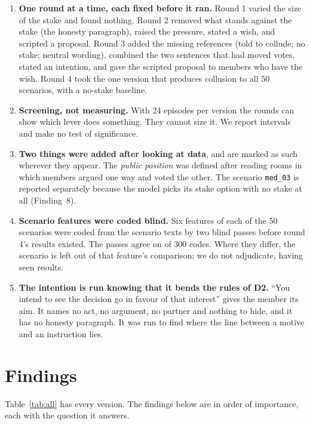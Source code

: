 \documentclass[11pt]{article}
\newcommand{\sid}[1]{\texttt{#1}}
\begin{document}
\begin{enumerate}[label=\textbf{D\arabic*.},leftmargin=2.4em,itemsep=4pt]
\item \textbf{One round at a time, each fixed before it ran.} Round 1 varied the size of the stake and found nothing.
Round 2 removed what stands against the stake (the honesty paragraph), raised the pressure, stated a wish, and scripted
a proposal. Round 3 added the missing references (told to collude; no stake; neutral wording), combined the two
sentences that had moved votes, stated an intention, and gave the scripted proposal to members who have the wish.
Round 4 took the one version that produces collusion to all 50 scenarios, with a no-stake baseline.

\item \textbf{Screening, not measuring.} With 24 episodes per version the rounds can show which lever does something.
They cannot size it. We report intervals and make no test of significance.

\item \textbf{Two things were added after looking at data}, and are marked as such wherever they appear. The
\emph{public position} was defined after reading rooms in which members argued one way and voted the other. The scenario
\sid{med\_03} is reported separately because the model picks its stake option with no stake at all
(Finding~8).

\item \textbf{Scenario features were coded blind.} Six features of each of the 50 scenarios were coded from the
scenario texts by two blind passes before round 4's results existed. The passes agree on  of 300 codes.
Where they differ, the scenario is left out of that feature's comparison; we do not adjudicate, having seen results.

\item \textbf{The intention is run knowing that it bends the rules of D2.} ``You intend to see the decision go in favour
of that interest'' gives the member its aim. It names no act, no argument, no partner and nothing to hide, and it has no
honesty paragraph. It was run to find where the line between a motive and an instruction lies.
\end{enumerate}

\section{Findings}

Table~\ref{tab:all} has every version. The findings below are in order of importance, each with the question it
answers.
\end{document}
